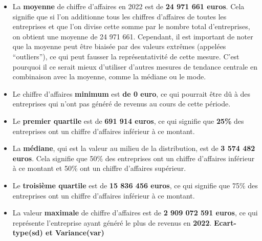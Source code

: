 \documentclass[mstat,12pt]{unswthesis}
\newenvironment{Shaded}{\begin{snugshade}}{\end{snugshade}}
\newcommand{\CommentTok}[1]{\textcolor[rgb]{0.56,0.35,0.01}{\textit{#1}}}
\newcommand{\FunctionTok}[1]{\textcolor[rgb]{0.00,0.00,0.00}{#1}}
\newcommand{\NormalTok}[1]{#1}
\newcommand{\SpecialCharTok}[1]{\textcolor[rgb]{0.00,0.00,0.00}{#1}}
\begin{document}
\begin{itemize}
\item
  La \textbf{moyenne} de chiffre d'affaires en 2022 est de \textbf{24
  971 661 euros}. Cela signifie que si l'on additionne tous les chiffres
  d'affaires de toutes les entreprises et que l'on divise cette somme
  par le nombre total d'entreprises, on obtient une moyenne de 24 971
  661. Cependant, il est important de noter que la moyenne peut être
  biaisée par des valeurs extrêmes (appelées ``outliers''), ce qui peut
  fausser la représentativité de cette mesure. C'est pourquoi il ce
  serait mieux d'utiliser d'autres mesures de tendance centrale en
  combinaison avec la moyenne, comme la médiane ou le mode.
\item
  Le chiffre d'affaires \textbf{minimum} est \textbf{de 0 euro}, ce qui
  pourrait être dû à des entreprises qui n'ont pas généré de revenus au
  cours de cette période.
\item
  Le \textbf{premier quartile} est de \textbf{691 914 euros}, ce qui
  signifie que \textbf{25\%} des entreprises ont un chiffre d'affaires
  inférieur à ce montant.
\item
  La \textbf{médiane}, qui est la valeur au milieu de la distribution,
  est de \textbf{3 574 482 euros}. Cela signifie que 50\% des
  entreprises ont un chiffre d'affaires inférieur à ce montant et 50\%
  ont un chiffre d'affaires supérieur.
\item
  Le \textbf{troisième quartile} est de \textbf{15 836 456 euros}, ce
  qui signifie que 75\% des entreprises ont un chiffre d'affaires
  inférieur à ce montant.
\item
  La valeur \textbf{maximale} de chiffre d'affaires est de \textbf{2 909
  072 591 euros}, ce qui représente l'entreprise ayant généré le plus de
  revenus en \textbf{2022}. \bigskip \textbf{Ecart-type(sd) et
  Variance(var)}
\end{itemize}

\begin{Shaded}
\end{Shaded}

\medskip
\end{document}

